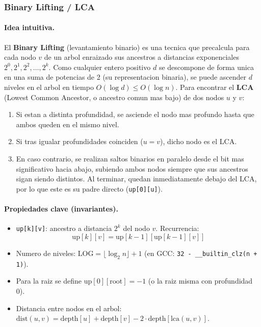 \subsubsection{Binary Lifting / LCA}

\paragraph{Idea intuitiva.}
El \textbf{Binary Lifting} (levantamiento binario) es una tecnica que precalcula para cada nodo $v$ de un arbol enraizado sus ancestros a distancias exponenciales $2^0, 2^1, 2^2, \dots, 2^k$. Como cualquier entero positivo $d$ se descompone de forma unica en una suma de potencias de 2 (su representacion binaria), se puede ascender $d$ niveles en el arbol en tiempo $O(\log d) \le O(\log n)$. Para encontrar el \textbf{LCA} (Lowest Common Ancestor, o ancestro comun mas bajo) de dos nodos $u$ y $v$:
\begin{enumerate}\setlength\itemsep{0pt}
	\item Si estan a distinta profundidad, se asciende el nodo mas profundo hasta que ambos queden en el mismo nivel.
	\item Si tras igualar profundidades coinciden ($u = v$), dicho nodo es el LCA.
	\item En caso contrario, se realizan saltos binarios en paralelo desde el bit mas significativo hacia abajo, subiendo ambos nodos siempre que sus ancestros sigan siendo distintos. Al terminar, quedan inmediatamente debajo del LCA, por lo que este es su padre directo (\texttt{up[0][u]}).
\end{enumerate}

\paragraph{Propiedades clave (invariantes).}
\begin{itemize}\setlength\itemsep{0pt}
	\item \texttt{up[k][v]}: ancestro a distancia $2^k$ del nodo $v$. Recurrencia:
	\[
	\text{up}[k][v] = \text{up}[k-1][\text{up}[k-1][v]]
	\]
	\item Numero de niveles: $\text{LOG} = \lfloor \log_2 n \rfloor + 1$ (en GCC: \verb|32 - __builtin_clz(n + 1)|).
	\item Para la raiz se define $\text{up}[0][\text{root}] = -1$ (o la raiz misma con profundidad 0).
	\item Distancia entre nodos en el arbol: $\text{dist}(u, v) = \text{depth}[u] + \text{depth}[v] - 2 \cdot \text{depth}[\text{lca}(u, v)]$.
\end{itemize}


